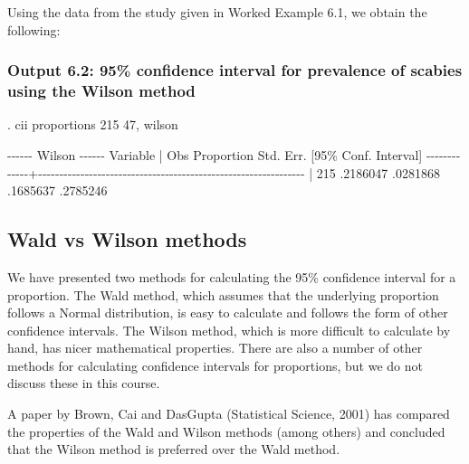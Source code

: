 \documentclass[
]{memoir}
\newenvironment{Shaded}{\begin{snugshade}}{\end{snugshade}}
\newcommand{\NormalTok}[1]{#1}
\begin{document}
Using the data from the study given in Worked Example 6.1, we obtain the following:

\hypertarget{output-6.2-95-confidence-interval-for-prevalence-of-scabies-using-the-wilson-method}{%
\subsubsection{Output 6.2: 95\% confidence interval for prevalence of scabies using the Wilson method}\label{output-6.2-95-confidence-interval-for-prevalence-of-scabies-using-the-wilson-method}}

\begin{Shaded}
\begin{Highlighting}[]
\NormalTok{. cii proportions 215 47, wilson}

\NormalTok{                                                         {-}{-}{-}{-}{-}{-} Wilson {-}{-}{-}{-}{-}{-}}
\NormalTok{    Variable |        Obs  Proportion    Std. Err.       [95\% Conf. Interval]}
\NormalTok{{-}{-}{-}{-}{-}{-}{-}{-}{-}{-}{-}{-}{-}+{-}{-}{-}{-}{-}{-}{-}{-}{-}{-}{-}{-}{-}{-}{-}{-}{-}{-}{-}{-}{-}{-}{-}{-}{-}{-}{-}{-}{-}{-}{-}{-}{-}{-}{-}{-}{-}{-}{-}{-}{-}{-}{-}{-}{-}{-}{-}{-}{-}{-}{-}{-}{-}{-}{-}{-}{-}{-}{-}{-}{-}{-}{-}}
\NormalTok{             |        215    .2186047    .0281868        .1685637    .2785246}
\end{Highlighting}
\end{Shaded}

\hypertarget{wald-vs-wilson-methods}{%
\subsection{Wald vs Wilson methods}\label{wald-vs-wilson-methods}}

We have presented two methods for calculating the 95\% confidence interval for a proportion. The Wald method, which assumes that the underlying proportion follows a Normal distribution, is easy to calculate and follows the form of other confidence intervals. The Wilson method, which is more difficult to calculate by hand, has nicer mathematical properties. There are also a number of other methods for calculating confidence intervals for proportions, but we do not discuss these in this course.

A paper by Brown, Cai and DasGupta (Statistical Science, 2001) has compared the properties of the Wald and Wilson methods (among others) and concluded that the Wilson method is preferred over the Wald method.
\end{document}
